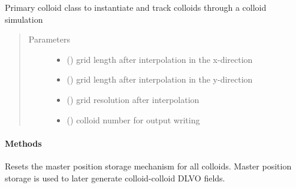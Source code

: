\documentclass[letterpaper,10pt,english]{sphinxmanual}
\begin{document}
\begin{fulllineitems}
\label{\detokenize{index:lb_colloids.Colloids.LB_Colloid.Colloid}}
Primary colloid class to instantiate and track colloids through a colloid simulation
\begin{quote}\begin{description}
\item[{Parameters}] \leavevmode\begin{itemize}
\item {} 
 () \textendash{} grid length after interpolation in the x-direction

\item {} 
 () \textendash{} grid length after interpolation in the y-direction

\item {} 
 () \textendash{} grid resolution after interpolation

\item {} 
 () \textendash{} colloid number for output writing

\end{itemize}

\end{description}\end{quote}
\paragraph{Methods}

\begin{fulllineitems}
\label{\detokenize{index:lb_colloids.Colloids.LB_Colloid.Colloid.reset_master_positions}}
Resets the master position storage mechanism for all colloids. Master position
storage is used to later generate colloid-colloid DLVO fields.

\end{fulllineitems}



\end{fulllineitems}
\end{document}
